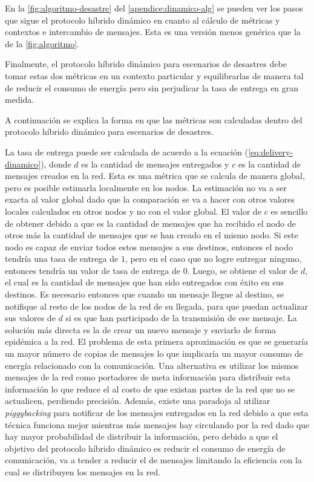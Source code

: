 En la \ref{fig:algoritmo-desastre} del \ref{apendice:dinamico-alg} se pueden ver
los pasos que sigue el protocolo híbrido dinámico en cuanto al cálculo de
métricas y contextos e intercambio de mensajes. Esta es una versión menos
genérica que la de la \ref{fig:algoritmo}.

Finalmente, el protocolo híbrido dinámico para escenarios de desastres debe
tomar estas dos métricas en un contexto particular y equilibrarlas de manera tal
de reducir el consumo de energía pero sin perjudicar la tasa de entrega en gran
medida.







A continuación se explica la forma en que las métricas son calculadas dentro del
protocolo híbrido dinámico para escenarios de desastres.

La tasa de entrega puede ser calculada de acuerdo a la ecuación
(\ref{eq:delivery-dinamico}), donde $d$ es la cantidad de mensajes entregados y
$c$ es la cantidad de mensajes creados en la red. Esta es una métrica que se
calcula de manera global, pero es posible estimarla localmente en los nodos. La
estimación no va a ser exacta al valor global dado que la comparación se va a
hacer con otros valores locales calculados en otros nodos y no con el valor
global. El valor de $c$ es sencillo de obtener debido a que es la cantidad de
mensajes que ha recibido el nodo de otros más la cantidad de mensajes que se han
creado en el mismo nodo. Si este nodo es capaz de enviar todos estos mensajes a
sus destinos, entonces el nodo tendría una tasa de entrega de $1$, pero en el
caso que no logre entregar ninguno, entonces tendría un valor de tasa de entrega
de $0$. Luego, se obtiene el valor de $d$, el cual es la cantidad de mensajes
que han sido entregados con éxito en sus destinos. Es necesario entonces que
cuando un mensaje llegue al destino, se notifique al resto de los nodos de la
red de su llegada, para que puedan actualizar sus valores de $d$ si es que han
participado de la transmisión de ese mensaje. La solución más directa es la de
crear un nuevo mensaje y enviarlo de forma epidémica a la red. El problema de
esta primera aproximación es que se generaría un mayor número de copias de
mensajes lo que implicaría un mayor consumo de energía relacionado con la
comunicación. Una alternativa es utilizar los mismos mensajes de la red como
portadores de meta información para distribuir esta información lo que reduce el
\overhead{} al costo de que existan partes de la red que no se actualicen,
perdiendo precisión. Además, existe una paradoja al utilizar
\textit{piggybacking} para notificar de los mensajes entregados en la red debido
a que esta técnica funciona mejor mientras más mensajes hay circulando por la
red dado que hay mayor probabilidad de distribuir la información, pero debido a
que el objetivo del protocolo híbrido dinámico es reducir el consumo de energía
de comunicación, va a tender a reducir el \overhead{} de mensajes limitando la
eficiencia con la cual se distribuyen los mensajes en la red.


